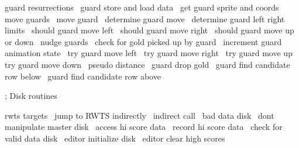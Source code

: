 \documentclass[10pt]{report}%
\begin{document}
    \LA{}guard resurrections~{\nwtagstyle{}}\RA{}
    \LA{}guard store and load data~{\nwtagstyle{}}\RA{}
    \LA{}get guard sprite and coords~{\nwtagstyle{}}\RA{}
    \LA{}move guards~{\nwtagstyle{}}\RA{}
    \LA{}move guard~{\nwtagstyle{}}\RA{}
    \LA{}determine guard move~{\nwtagstyle{}}\RA{}
    \LA{}determine guard left right limits~{\nwtagstyle{}}\RA{}
    \LA{}should guard move left~{\nwtagstyle{}}\RA{}
    \LA{}should guard move right~{\nwtagstyle{}}\RA{}
    \LA{}should guard move up or down~{\nwtagstyle{}}\RA{}
    \LA{}nudge guards~{\nwtagstyle{}}\RA{}
    \LA{}check for gold picked up by guard~{\nwtagstyle{}}\RA{}
    \LA{}increment guard animation state~{\nwtagstyle{}}\RA{}
    \LA{}try guard move left~{\nwtagstyle{}}\RA{}
    \LA{}try guard move right~{\nwtagstyle{}}\RA{}
    \LA{}try guard move up~{\nwtagstyle{}}\RA{}
    \LA{}try guard move down~{\nwtagstyle{}}\RA{}
    \LA{}pseudo distance~{\nwtagstyle{}}\RA{}
    \LA{}guard drop gold~{\nwtagstyle{}}\RA{}
    \LA{}guard find candidate row below~{\nwtagstyle{}}\RA{}
    \LA{}guard find candidate row above~{\nwtagstyle{}}\RA{}

    ; Disk routines

    \LA{}rwts targets~{\nwtagstyle{}}\RA{}
    \LA{}jump to RWTS indirectly~{\nwtagstyle{}}\RA{}
    \LA{}indirect call~{\nwtagstyle{}}\RA{}
    \LA{}bad data disk~{\nwtagstyle{}}\RA{}
    \LA{}dont manipulate master disk~{\nwtagstyle{}}\RA{}
    \LA{}access hi score data~{\nwtagstyle{}}\RA{}
    \LA{}record hi score data~{\nwtagstyle{}}\RA{}
    \LA{}check for valid data disk~{\nwtagstyle{}}\RA{}
    \LA{}editor initialize disk~{\nwtagstyle{}}\RA{}
    \LA{}editor clear high scores~{\nwtagstyle{}}\RA{}
\end{document}
